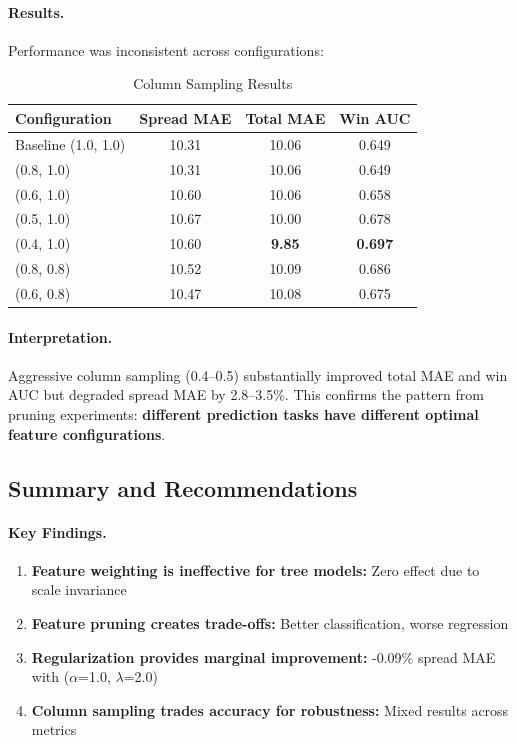 \paragraph{Results.}
Performance was inconsistent across configurations:

\begin{table}[htbp]
\centering
\caption{Column Sampling Results}
\label{tab:colsample-results}
\small
\begin{tabular}{@{} l S[table-format=2.2] S[table-format=2.2] S[table-format=1.3] @{}}
\toprule
\textbf{Configuration} & \textbf{Spread MAE} & \textbf{Total MAE} & \textbf{Win AUC} \\
\midrule
Baseline (1.0, 1.0) & 10.31 & 10.06 & 0.649 \\
(0.8, 1.0) & 10.31 & 10.06 & 0.649 \\
(0.6, 1.0) & 10.60 & 10.06 & 0.658 \\
(0.5, 1.0) & 10.67 & 10.00 & 0.678 \\
(0.4, 1.0) & 10.60 & \textbf{9.85} & \textbf{0.697} \\
(0.8, 0.8) & 10.52 & 10.09 & 0.686 \\
(0.6, 0.8) & 10.47 & 10.08 & 0.675 \\
\bottomrule
\end{tabular}
\end{table}

\paragraph{Interpretation.}
Aggressive column sampling (0.4--0.5) substantially improved total MAE and win AUC but degraded spread MAE by 2.8--3.5\%. This confirms the pattern from pruning experiments: \textbf{different prediction tasks have different optimal feature configurations}.

\subsection{Summary and Recommendations}

\paragraph{Key Findings.}

\begin{enumerate}[itemsep=2pt,parsep=0pt]
    \item \textbf{Feature weighting is ineffective for tree models:} Zero effect due to scale invariance
    \item \textbf{Feature pruning creates trade-offs:} Better classification, worse regression
    \item \textbf{Regularization provides marginal improvement:} -0.09\% spread MAE with ($\alpha$=1.0, $\lambda$=2.0)
    \item \textbf{Column sampling trades accuracy for robustness:} Mixed results across metrics
\end{enumerate}

